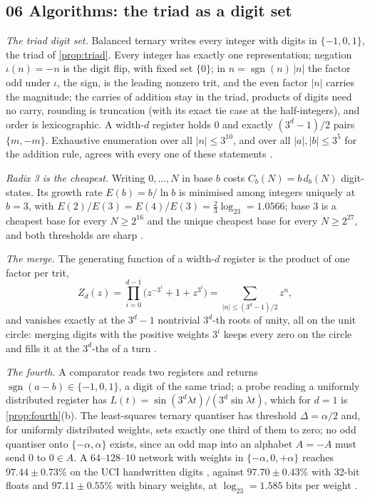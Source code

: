 \documentclass[11pt]{article}
\theoremstyle{definition}\newtheorem{definition}[theorem]{Definition}
\theoremstyle{remark}\newtheorem{remark}[theorem]{Remark}
\begin{document}
\subsection{06 Algorithms: the triad as a digit set}\label{sec:f06}
\emph{The triad digit set.} Balanced ternary writes every integer with digits in $\{-1,0,1\}$, the triad of \cref{prop:triad}. Every integer has exactly one representation; negation $\iota(n)=-n$ is the digit flip, with fixed set $\{0\}$; in $n=\operatorname{sgn}(n)\,|n|$ the factor odd under $\iota$, the sign, is the leading nonzero trit, and the even factor $|n|$ carries the magnitude; the carries of addition stay in the triad, products of digits need no carry, rounding is truncation (with its exact tie case at the half-integers), and order is lexicographic. A width-$d$ register holds $0$ and exactly $(3^d-1)/2$ pairs $\{m,-m\}$. Exhaustive enumeration over all $|n|\le3^{10}$, and over all $|a|,|b|\le3^5$ for the addition rule, agrees with every one of these statements \cite{SAlg}.

\emph{Radix 3 is the cheapest.} Writing $0,\dots,N$ in base $b$ costs $C_b(N)=b\,d_b(N)$ digit-states. Its growth rate $E(b)=b/\ln b$ is minimised among integers uniquely at $b=3$, with $E(2)/E(3)=E(4)/E(3)=\frac23\log_23=1.0566$; base $3$ is a cheapest base for every $N\ge2^{16}$ and the unique cheapest base for every $N\ge2^{27}$, and both thresholds are sharp \cite{SAlg}.

\emph{The merge.} The generating function of a width-$d$ register is the product of one factor per trit,
\[
Z_d(z)=\prod_{i=0}^{d-1}\bigl(z^{-3^i}+1+z^{3^i}\bigr)=\sum_{|n|\le(3^d-1)/2}z^n ,
\]
and vanishes exactly at the $3^d-1$ nontrivial $3^d$-th roots of unity, all on the unit circle: merging digits with the positive weights $3^i$ keeps every zero on the circle and fills it at the $3^d$-ths of a turn \cite{SAlg}.

\emph{The fourth.} A comparator reads two registers and returns $\operatorname{sgn}(a-b)\in\{-1,0,1\}$, a digit of the same triad; a probe reading a uniformly distributed register has $L(t)=\sin(3^d\lambda t)/(3^d\sin\lambda t)$, which for $d=1$ is \cref{prop:fourth}(b). The least-squares ternary quantiser has threshold $\Delta=\alpha/2$ and, for uniformly distributed weights, sets exactly one third of them to zero; no odd quantiser onto $\{-\alpha,\alpha\}$ exists, since an odd map into an alphabet $A=-A$ must send $0$ to $0\in A$. A $64$--$128$--$10$ network with weights in $\{-\alpha,0,+\alpha\}$ reaches $97.44\pm0.73\%$ on the UCI handwritten digits \cite{UCIdigits}, against $97.70\pm0.43\%$ with 32-bit floats and $97.11\pm0.55\%$ with binary weights, at $\log_23=1.585$ bits per weight \cite{SAlg}.
\end{document}
